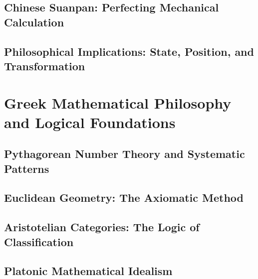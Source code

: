 \documentclass[12pt, oneside, openany]{book}
\begin{document}
\section{Chinese Suanpan: Perfecting Mechanical Calculation}

\section{Philosophical Implications: State, Position, and Transformation}


\chapter{Greek Mathematical Philosophy and Logical Foundations}

\section{Pythagorean Number Theory and Systematic Patterns}

\section{Euclidean Geometry: The Axiomatic Method}

\section{Aristotelian Categories: The Logic of Classification}

\section{Platonic Mathematical Idealism}
\end{document}
